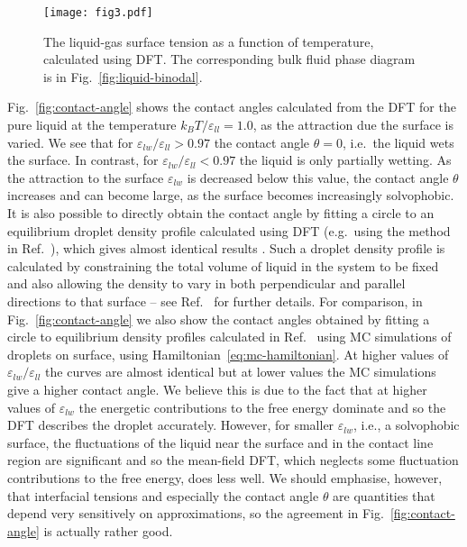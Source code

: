 \documentclass[journal=langd5,manuscript=article]{achemso}
\def\e{\varepsilon}
\begin{document}
\begin{figure}
\centering
  \texttt{[image: fig3.pdf]}
\caption{%
  The liquid-gas surface tension as a function of temperature,
  calculated using DFT. The corresponding bulk fluid phase diagram is
  in Fig.~\ref{fig:liquid-binodal}.
}
\label{fig:surface-tension}
\end{figure}

Fig.~\ref{fig:contact-angle} shows the contact angles calculated from the
DFT for the pure liquid at the temperature $k_BT/\e_{ll} =
1.0$, as the attraction due the surface is varied. We see that for $\e_{lw}/\e_{ll}>0.97$ the contact angle $\theta=0$, i.e.\ the liquid wets the surface. In contrast, for $\e_{lw}/\e_{ll}<0.97$ the liquid is only partially wetting. As the attraction to the surface $\e_{lw}$ is decreased below this value, the contact angle $\theta$ increases and can become large, as the surface becomes increasingly solvophobic. It is also possible to directly obtain the contact angle by
fitting a circle to an equilibrium droplet density profile calculated
using DFT (e.g.\ using the method in Ref.~), which gives almost identical results \cite{hughes2015}.
Such a droplet density profile is calculated by constraining the total
volume of liquid in the system to be fixed and also allowing the density
to vary in both perpendicular and parallel directions to that surface --
see Ref.~ for further details.
For comparison, in Fig.~\ref{fig:contact-angle} we also show the contact angles obtained by fitting a
circle to equilibrium density profiles calculated in Ref.~
using MC simulations of droplets on surface, using
Hamiltonian~\eqref{eq:mc-hamiltonian}. At higher values of
$\e_{lw}/\e_{ll}$ the curves are almost identical but at lower values
the MC simulations give a higher contact angle. We believe this is due
to the fact that at higher values of $\e_{lw}$ the energetic
contributions to the free energy dominate and so the DFT describes the
droplet accurately. However, for smaller $\e_{lw}$, i.e., a solvophobic
surface, the fluctuations of the liquid near the surface and in the
contact line region are significant \cite{evans2015,chacko2017} and so
the mean-field DFT, which neglects some fluctuation contributions to the
free energy, does less well. We should emphasise, however, that
interfacial tensions and especially the contact angle $\theta$ are
quantities that depend very sensitively on approximations, so the agreement in Fig.\ \ref{fig:contact-angle} is actually rather good.
\end{document}
